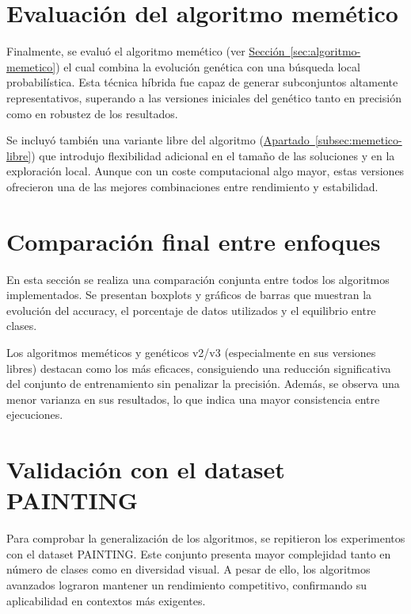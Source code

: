 \section{Evaluación del algoritmo memético}\label{sec:evaluacion-algoritmo-memetico}
Finalmente, se evaluó el algoritmo memético (ver \hyperref[sec:algoritmo-memetico]{Sección~\ref*{sec:algoritmo-memetico}}) el cual combina la evolución genética con una búsqueda local probabilística.
Esta técnica híbrida fue capaz de generar subconjuntos altamente representativos, superando a las versiones iniciales del genético tanto en precisión como en robustez de los resultados.

Se incluyó también una variante libre del algoritmo (\hyperref[subsec:memetico-libre]{Apartado~\ref*{subsec:memetico-libre}}) que introdujo flexibilidad adicional en el tamaño de las soluciones y en la exploración local.
Aunque con un coste computacional algo mayor, estas versiones ofrecieron una de las mejores combinaciones entre rendimiento y estabilidad.

\section{Comparación final entre enfoques}\label{sec:comparacion-final-enfoques}
En esta sección se realiza una comparación conjunta entre todos los algoritmos implementados.
Se presentan boxplots y gráficos de barras que muestran la evolución del accuracy, el porcentaje de datos utilizados y el equilibrio entre clases.

Los algoritmos meméticos y genéticos v2/v3 (especialmente en sus versiones libres) destacan como los más eficaces, consiguiendo una reducción significativa del conjunto de entrenamiento sin penalizar la precisión.
Además, se observa una menor varianza en sus resultados, lo que indica una mayor consistencia entre ejecuciones.

\section{Validación con el dataset PAINTING}\label{sec:validacion-con-painting}
Para comprobar la generalización de los algoritmos, se repitieron los experimentos con el dataset PAINTING.
Este conjunto presenta mayor complejidad tanto en número de clases como en diversidad visual.
A pesar de ello, los algoritmos avanzados lograron mantener un rendimiento competitivo, confirmando su aplicabilidad en contextos más exigentes.